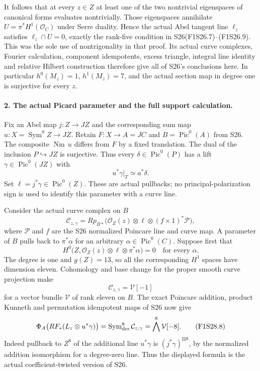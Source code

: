 It follows that at every $z\in Z$ at least one of the two
nontrivial eigenspaces of canonical forms evaluates
nontrivially. Those eigenspaces annihilate
$U=\pi^*H^1(\mathcal O_C)$ under Serre duality. Hence the
actual Abel tangent line $\ell_z$ satisfies
$\ell_z\cap U=0$, exactly the rank-five condition in
S26(F1S26.7)--(F1S26.9). This was the sole use of
nontrigonality in that proof. Its actual curve complexes,
Fourier calculation, component idempotents, excess triangle,
integral line identity and relative Hilbert construction
therefore give all of S26's conclusions here. In particular
$h^0(M_z)=1$, $h^1(M_z)=7$, and the actual section map in
degree one is surjective for every $z$.

\paragraph{2. The actual Picard parameter and the full support calculation.}
Fix an Abel map $j:Z\to JZ$ and the corresponding sum map
$u:X=\operatorname{Sym}^8Z\to JZ$. Retain
$F:X\to A=JC$ and $B=\operatorname{Pic}^0(A)$ from S26.
The composite $\operatorname{Nm}\,u$ differs from $F$ by
a fixed translation. The dual of the inclusion $P\hookrightarrow JZ$
is surjective. Thus every $\delta\in\operatorname{Pic}^0(P)$
has a lift $\gamma\in\operatorname{Pic}^0(JZ)$ with
\[
                              u^*\gamma|_T\simeq a^*\delta.
 \tag{F1S28.4}
\]
Set $\ell=j^*\gamma\in\operatorname{Pic}^0(Z)$.
These are actual pullbacks; no principal-polarization sign
is used to identify this parameter with a curve line.

Consider the actual curve complex on $B$
\[
 \mathcal C_{z,\gamma}=Rp_{B*}
  \bigl(\mathcal O_Z(z)\otimes\ell
                 \otimes(f\times1)^*\mathcal P\bigr),
 \tag{F1S28.5}
\]
where $\mathcal P$ and $f$ are the S26 normalized Poincare
line and curve map. A parameter of $B$ pulls back to
$\pi^*\alpha$ for an arbitrary $\alpha\in\operatorname{Pic}^0(C)$.
Suppose first that
\[
 H^0\bigl(Z,\mathcal O_Z(z)\otimes\ell\otimes\pi^*\alpha\bigr)=0
                   \quad\text{for every }\alpha.
 \tag{F1S28.6}
\]
The degree is one and $g(Z)=13$, so all the corresponding
$H^1$ spaces have dimension eleven. Cohomology and base
change for the proper smooth curve projection make
\[
                         \mathcal C_{z,\gamma}=\mathcal V[-1]
 \tag{F1S28.7}
\]
for a vector bundle $\mathcal V$ of rank eleven on $B$.
The exact Poincare addition, product Kunneth and permutation
idempotent maps of S26 now give
\[
 \Phi_A\bigl(RF_*(L_z\otimes u^*\gamma)\bigr)
          =\operatorname{Sym}^8_{\rm der}\mathcal C_{z,\gamma}
          =\bigwedge^8\mathcal V[-8].
 \tag{F1S28.8}
\]
Indeed pullback to $Z^8$ of the additional line $u^*\gamma$
is $(j^*\gamma)^{\boxtimes8}$, by the normalized addition
isomorphism for a degree-zero line. Thus the displayed
formula is the actual coefficient-twisted version of S26.

